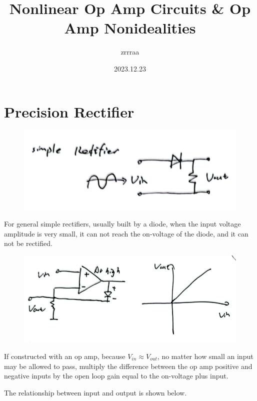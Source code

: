 \documentclass[fontset=windows]{article}
\title{\heiti\zihao{2} Nonlinear Op Amp Circuits \& Op Amp Nonidealities}
\author{\songti zrrraa}
\date{2023.12.23}
\begin{document}
\maketitle
\thispagestyle{empty}

\section*{Precision Rectifier}

\begin{figure}[htbp]
    \centering
    \includegraphics[scale=0.7]{1.jpg}
    \captionsetup{labelformat=empty}
    \caption{}
    \label{1}
\end{figure}

For general simple rectifiers, usually built by a diode, when the input voltage amplitude is very small, it can not reach the on-voltage of the diode, and it can not be rectified. 

\begin{figure}[htbp]
    \centering
    \includegraphics[scale=0.7]{2.jpg}
    \captionsetup{labelformat=empty}
    \caption{}
    \label{2}
\end{figure}

If constructed with an op amp, because $V_{in}\approx V_{out}$, no matter how small an input may be allowed to pass, multiply the difference between the op amp positive and negative inputs by the open loop gain equal to the on-voltage plus input. 

The relationship between input and output is shown below. 
\end{document}
